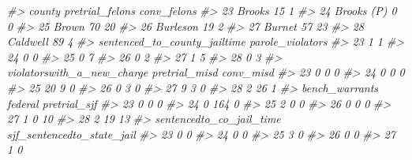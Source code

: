 \documentclass[
]{krantz}
\makeatletter
\newenvironment{Shaded}{\begin{snugshade}}{\end{snugshade}}
\newcommand{\CommentTok}[1]{\textcolor[rgb]{0.37,0.37,0.37}{\textit{#1}}}
\newenvironment{kframe}{%
\medskip{}
\setlength{\fboxsep}{.8em}
 \def\at@end@of@kframe{}%
 \ifinner\ifhmode%
  \def\at@end@of@kframe{\end{minipage}}%
  \begin{minipage}{\columnwidth}%
 \fi\fi%
 \def\FrameCommand##1{\hskip\@totalleftmargin \hskip-\fboxsep
 \colorbox{shadecolor}{##1}\hskip-\fboxsep
     \hskip-\linewidth \hskip-\@totalleftmargin \hskip\columnwidth}%
 \MakeFramed {\advance\hsize-\width
   \@totalleftmargin\z@ \linewidth\hsize
   \@setminipage}}%
 {\par\unskip\endMakeFramed%
 \at@end@of@kframe}
\renewenvironment{Shaded}{\begin{kframe}}{\end{kframe}}
\makeatother
\begin{document}
\begin{Shaded}
\begin{Highlighting}[]
\CommentTok{\#\textgreater{}        county pretrial\_felons conv\_felons}
\CommentTok{\#\textgreater{} 23     Brooks              15           1}
\CommentTok{\#\textgreater{} 24 Brooks (P)               0           0}
\CommentTok{\#\textgreater{} 25      Brown              70          20}
\CommentTok{\#\textgreater{} 26   Burleson              19           2}
\CommentTok{\#\textgreater{} 27     Burnet              57          23}
\CommentTok{\#\textgreater{} 28   Caldwell              89           4}
\CommentTok{\#\textgreater{}    sentenced\_to\_county\_jailtime parole\_violators}
\CommentTok{\#\textgreater{} 23                            1                1}
\CommentTok{\#\textgreater{} 24                            0                0}
\CommentTok{\#\textgreater{} 25                            0                7}
\CommentTok{\#\textgreater{} 26                            0                2}
\CommentTok{\#\textgreater{} 27                            1                5}
\CommentTok{\#\textgreater{} 28                            0                3}
\CommentTok{\#\textgreater{}    violatorswith\_a\_new\_charge pretrial\_misd conv\_misd}
\CommentTok{\#\textgreater{} 23                          0             0         0}
\CommentTok{\#\textgreater{} 24                          0             0         0}
\CommentTok{\#\textgreater{} 25                         20             9         0}
\CommentTok{\#\textgreater{} 26                          0             3         0}
\CommentTok{\#\textgreater{} 27                          9             3         0}
\CommentTok{\#\textgreater{} 28                          2            26         1}
\CommentTok{\#\textgreater{}    bench\_warrants federal pretrial\_sjf}
\CommentTok{\#\textgreater{} 23              0       0            0}
\CommentTok{\#\textgreater{} 24              0     164            0}
\CommentTok{\#\textgreater{} 25              2       0            0}
\CommentTok{\#\textgreater{} 26              0       0            0}
\CommentTok{\#\textgreater{} 27              1       0           10}
\CommentTok{\#\textgreater{} 28              2      19           13}
\CommentTok{\#\textgreater{}    sentencedto\_co\_jail\_time sjf\_sentencedto\_state\_jail}
\CommentTok{\#\textgreater{} 23                        0                          0}
\CommentTok{\#\textgreater{} 24                        0                          0}
\CommentTok{\#\textgreater{} 25                        3                          0}
\CommentTok{\#\textgreater{} 26                        0                          0}
\CommentTok{\#\textgreater{} 27                        1                          0}

\end{Highlighting}
\end{Shaded}
\end{document}

